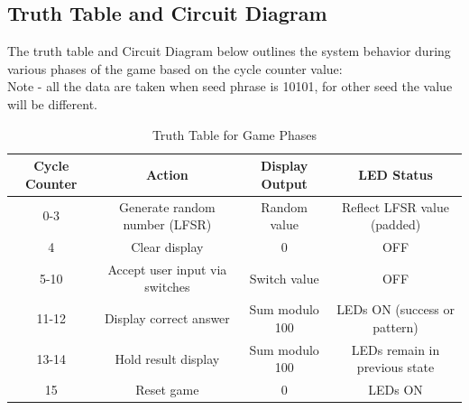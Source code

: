 \documentclass[10pt,a4paper,twocolumn,twoside]{tau-class/tau}
\begin{document}
    \subsection{Truth Table and Circuit Diagram}
    
    The truth table and Circuit Diagram below outlines the system behavior during various phases of the game based on the cycle counter value:
    \vspace{15pt}
    \\
    Note - all the data are taken when seed phrase is 10101, for other seed the value will be different.

    \begin{table}[tp]
        \centering
        \begin{tabular}{|c|c|c|c|}
            \hline
            \textbf{Cycle Counter} & \textbf{Action} & \textbf{Display Output} & \textbf{LED Status} \\
            \hline
            0-3 & Generate random number (LFSR) & Random value & Reflect LFSR value (padded) \\
            4 & Clear display & 0 & OFF \\
            5-10 & Accept user input via switches & Switch value & OFF \\
            11-12 & Display correct answer & Sum modulo 100 & LEDs ON (success or pattern) \\
            13-14 & Hold result display & Sum modulo 100 & LEDs remain in previous state \\
            15 & Reset game & 0 & LEDs ON \\
            \hline
        \end{tabular}
        \caption{Truth Table for Game Phases}
        \label{tab:truthtable}
    \end{table}
    
\end{document}
